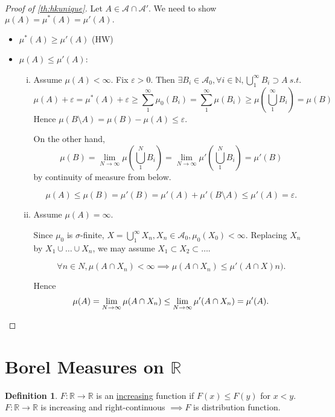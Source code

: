 \documentclass{report}
\newcommand{\R}{\mathbb{R}}
\newcommand{\N}{\mathbb{N}}
\newcommand{\st}{\ s.t.\ }
\theoremstyle{definition}
\newtheorem{definition}[theorem]{Definition}
\theoremstyle{remark}
\newcommand*\ttlmath[2]{\texorpdfstring{$\boldsymbol{#1}$}{#2}}
\begin{document}
\begin{proof}[Proof of \ref{th:hkunique}]
Let $A \in \mathcal{A} \cap \mathcal{A}'$. We need to show $\mu(A) = \mu^*(A) = \mu'(A).$
\begin{itemize}
\item
$\mu^*(A) \geq \mu'(A)$ (HW)

\item
$\mu(A) \leq \mu'(A)$:
\begin{enumerate}[(i)]
\item Assume $\mu(A) < \infty.$ Fix $\varepsilon > 0$. Then $\exists B_i \in \mathcal{A}_0, \forall i \in \N, \bigcup_1^\infty B_i \supset A \st$
\[
\mu(A) + \varepsilon = \mu^*(A) + \varepsilon \geq \sum_1^\infty \mu_0(B_i) = \sum_1^\infty \mu(B_i) \geq \mu \left(\bigcup_1^\infty B_i\right) = \mu(B)
\]
Hence $\mu(B \setminus A) = \mu(B) - \mu(A) \leq \varepsilon.$

On the other hand, 
\[
\mu(B) = \lim_{N \to \infty} \mu\left(\bigcup_1^N B_i\right) = \lim_{N \to \infty} \mu'\left(\bigcup_1^N B_i\right) = \mu'(B)
\]
by continuity of measure from below.

\[
\mu(A) \leq \mu(B) = \mu'(B) = \mu'(A) + \mu'(B \setminus A) \leq \mu'(A) = \varepsilon.
\]
\item
Assume $\mu(A) = \infty.$

Since $\mu_0$ is $\sigma$-finite, $X = \bigcup_1^\infty X_n, X_n \in \mathcal{A}_0, \mu_0(X_0) < \infty.$
Replacing $X_n$ by $X_1 \cup \ldots \cup X_n$, we may assume $X_1 \subset X_2 \subset \ldots$.

\[\forall n \in N, \mu(A \cap X_n) < \infty \implies \mu(A \cap X_n) \leq \mu'(A \cap X)n).\]

Hence
\[
\mu(A) = \lim_{N \to \infty} \mu(A \cap X_n) \leq \lim_{N \to \infty} \mu'(A \cap X_n) = \mu'(A). \qedhere
\]
\end{enumerate}
\end{itemize}
\end{proof}

\section{Borel Measures on \ttlmath{\R}{Reals}}
\begin{definition}
$F: \R \to \R$ is an \underline{increasing} function if $F(x) \leq F(y)$ for $x < y$.
$F: \R \to \R$ is increasing and right-continuous $\implies F$ is distribution function. 
\end{definition}
\end{document}
